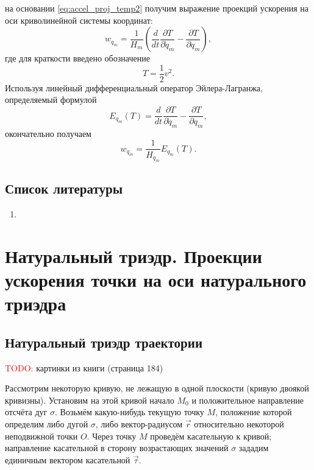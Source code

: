 \documentclass{article}
\theoremstyle{definition}
\theoremstyle{plain}
\theoremstyle{remark}
\numberwithin{equation}{section}
\newcommand{\paren}[1]{\left( #1 \right)}
\newcommand{\der}[2][]{\frac{d #1}{d #2}}
\newcommand{\parder}[2][]{\frac{\partial #1}{\partial #2}}
\newcommand{\dt}[1][]{\der[#1]{t}}
\begin{document}
на основании \autoref{eq:accel_proj_temp2} получим выражение проекций ускорения
на оси криволинейной системы координат:
\begin{equation}
  w_{q_m} = \frac{1}{H_m} \paren{\dt \parder[T]{\dot{q}_m} - \parder[T]{q_m}},
\end{equation}
где для краткости введено обозначение
\begin{equation}
  T = \frac{1}{2} v^2.
\end{equation}
Используя линейный дифференциальный оператор Эйлера-Лагранжа, определяемый
формулой
\begin{equation}
  E_{q_m}(T) = \dt \parder[T]{\dot{q}_m} - \parder[T]{q_m},
\end{equation}
окончательно получаем
\begin{equation}
  \label{eq:accel_proj}
  w_{q_m} = \frac{1}{H_{q_m}} E_{q_m}(T).
\end{equation}

\subsection{Список литературы}
\begin{enumerate}
  \item \cite{lourie}
\end{enumerate}

\pagebreak


\section{Натуральный триэдр. Проекции ускорения точки на оси натурального
триэдра}

\subsection{Натуральный триэдр траектории}

\textcolor{red}{TODO:} картинки из книги (страница 184)

Рассмотрим некоторую кривую, не лежащую в одной плоскости (кривую двоякой
кривизны). Установим на этой кривой начало $M_0$ и положительное направление
отсчёта дуг $\sigma$. Возьмём какую-нибудь текущую точку $M$, положение
которой определим либо дугой $\sigma$, либо вектор-радиусом $\vec{r}$
относительно некоторой неподвижной точки $O$. Через точку $M$ проведём
касательную к кривой; направление касательной в сторону возрастающих значений
$\sigma$ зададим единичным вектором касательной $\vec{\tau}$.
\end{document}
